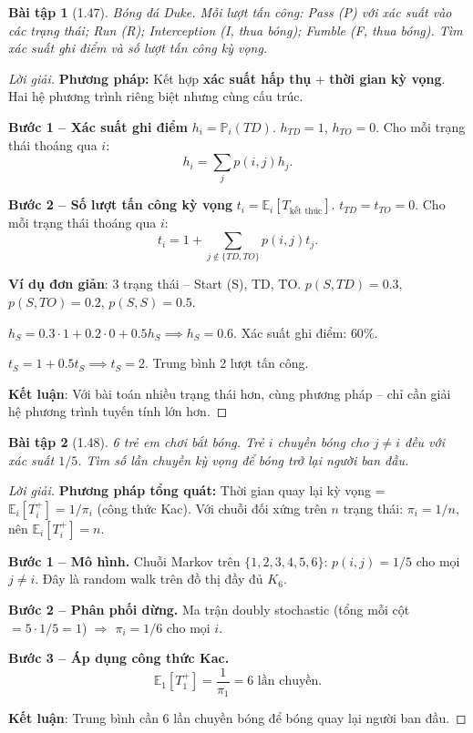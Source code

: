 \documentclass[8pt,a4paper]{article}
\newtheorem{exercise}{Bài tập}
\newenvironment{solution}{\begin{proof}[Lời giải]}{\end{proof}}
\newcommand{\prob}{\mathbb{P}}
\newcommand{\E}{\mathbb{E}}
\begin{document}
\begin{exercise}[1.47]
Bóng đá Duke. Mỗi lượt tấn công: Pass (P) với xác suất vào các trạng thái; Run (R); Interception (I, thua bóng); Fumble (F, thua bóng). Tìm xác suất ghi điểm và số lượt tấn công kỳ vọng.
\end{exercise}
\begin{solution}
\textbf{Phương pháp:} Kết hợp \textbf{xác suất hấp thụ} + \textbf{thời gian kỳ vọng}. Hai hệ phương trình riêng biệt nhưng cùng cấu trúc.

\textbf{Bước 1 -- Xác suất ghi điểm} $h_i = \prob_i(TD)$.
$h_{TD} = 1$, $h_{TO} = 0$. Cho mỗi trạng thái thoáng qua $i$:
\[
  h_i = \sum_j p(i,j) h_j.
\]

\textbf{Bước 2 -- Số lượt tấn công kỳ vọng} $t_i = \E_i[T_{\text{kết thúc}}]$.
$t_{TD} = t_{TO} = 0$. Cho mỗi trạng thái thoáng qua $i$:
\[
  t_i = 1 + \sum_{j \notin \{TD,TO\}} p(i,j) t_j.
\]

\textbf{Ví dụ đơn giản}: 3 trạng thái -- Start (S), TD, TO. $p(S, TD) = 0.3$, $p(S, TO) = 0.2$, $p(S, S) = 0.5$.

$h_S = 0.3 \cdot 1 + 0.2 \cdot 0 + 0.5 h_S \implies h_S = 0.6$. Xác suất ghi điểm: $60\%$.

$t_S = 1 + 0.5 t_S \implies t_S = 2$. Trung bình 2 lượt tấn công.

\textbf{Kết luận}: Với bài toán nhiều trạng thái hơn, cùng phương pháp -- chỉ cần giải hệ phương trình tuyến tính lớn hơn.
\end{solution}

\begin{exercise}[1.48]
6 trẻ em chơi bắt bóng. Trẻ $i$ chuyền bóng cho $j \neq i$ đều với xác suất $1/5$. Tìm số lần chuyền kỳ vọng để bóng trở lại người ban đầu.
\end{exercise}
\begin{solution}
\textbf{Phương pháp tổng quát:} Thời gian quay lại kỳ vọng = $\E_i[T_i^+] = 1/\pi_i$ (công thức Kac). Với chuỗi đối xứng trên $n$ trạng thái: $\pi_i = 1/n$, nên $\E_i[T_i^+] = n$.

\textbf{Bước 1 -- Mô hình.}
Chuỗi Markov trên $\{1,2,3,4,5,6\}$: $p(i,j) = 1/5$ cho mọi $j \neq i$. Đây là random walk trên đồ thị đầy đủ $K_6$.

\textbf{Bước 2 -- Phân phối dừng.}
Ma trận doubly stochastic (tổng mỗi cột $= 5 \cdot 1/5 = 1$) $\Rightarrow$ $\pi_i = 1/6$ cho mọi $i$.

\textbf{Bước 3 -- Áp dụng công thức Kac.}
\[
  \E_1[T_1^+] = \frac{1}{\pi_1} = 6 \text{ lần chuyền}.
\]

\textbf{Kết luận}: Trung bình cần 6 lần chuyền bóng để bóng quay lại người ban đầu.
\end{solution}
\end{document}
